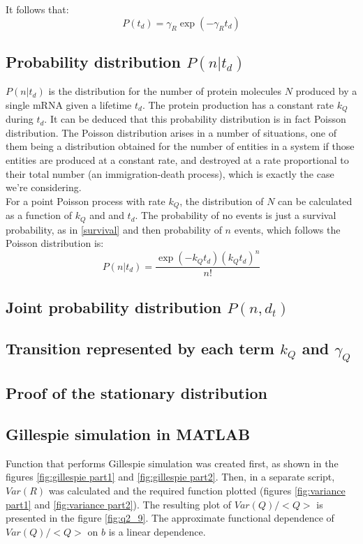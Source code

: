 \documentclass[a4paper]{article}
\begin{document}
It follows that:
\begin{equation}
P(t_d) = \gamma_R\exp(-\gamma_Rt_d)
\end{equation}

\subsection{Probability distribution $P(n|t_d)$}


$P(n|t_d)$ is the distribution for the number of protein molecules $N$ produced by a single mRNA given a lifetime $t_d$. The protein production has a constant rate $k_Q$ during $t_d$. It can be deduced that this probability distribution is in fact Poisson distribution. The Poisson distribution arises in a number of situations, one of them being a distribution obtained for the number of entities in a system if those entities are produced at a constant rate, and destroyed at a rate proportional to their total number (an immigration-death process), which is exactly the case we're considering. \\


For a point Poisson process with rate $k_Q$, the distribution of $N$ can be calculated as a function of $k_Q$ and and $t_d$. The probability of no events is just a survival probability, as in \ref{survival} and then probability of $n$ events, which follows the Poisson distribution is:
\begin{equation}
P(n|t_d) = \frac{\exp(-k_Qt_d){(k_Qt_d)}^n}{n!}
\end{equation}

\subsection{Joint probability distribution $P(n,d_t)$}

\subsection{Transition represented by each term $k_Q$ and $\gamma_Q$}

\subsection{Proof of the stationary distribution}

\subsection{Gillespie simulation in MATLAB}
Function that performs Gillespie simulation was created first, as shown in the figures \ref{fig:gillespie part1} and \ref{fig:gillespie part2}. Then, in a separate script, $Var(R)$ was calculated and the required function plotted (figures \ref{fig:variance part1} and \ref{fig:variance part2}). The resulting plot of $Var(Q)/<Q>$ is presented in the figure \ref{fig:q2_9}. The approximate functional dependence of $Var(Q)/<Q>$ on $b$ is a linear dependence. 
\end{document}
